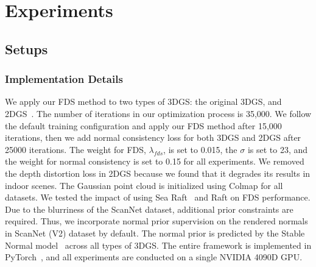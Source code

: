 \section{Experiments}

\subsection{Setups}
\subsubsection{Implementation Details}
We apply our FDS method to two types of 3DGS: 
the original 3DGS, and 2DGS~\citep{huang20242d}. 
%
The number of iterations in our optimization 
process is 35,000.
We follow the default training configuration 
and apply our FDS method after 15,000 iterations,
then we add normal consistency loss for both
3DGS and 2DGS after 25000 iterations.
%
The weight for FDS, $\lambda_{fds}$, is set to 0.015,
the $\sigma$ is set to 23,
and the weight for normal consistency is set to 0.15
for all experiments. 
We removed the depth distortion loss in 2DGS 
because we found that it degrades its results in indoor scenes.
%
The Gaussian point cloud is initialized using Colmap
for all datasets.
%
%
We tested the impact of 
using Sea Raft~\citep{wang2025sea} and 
Raft\citep{teed2020raft} on FDS performance.
%
Due to the blurriness of the ScanNet dataset, 
additional prior constraints are required.
Thus, we incorporate normal prior supervision 
on the rendered normals 
in ScanNet (V2) dataset by default.
The normal prior is predicted by the Stable Normal 
model~\citep{ye2024stablenormal}
across all types of 3DGS.
%
The entire framework is implemented in 
PyTorch~\citep{paszke2019pytorch}, 
and all experiments are conducted on 
a single NVIDIA 4090D GPU.

